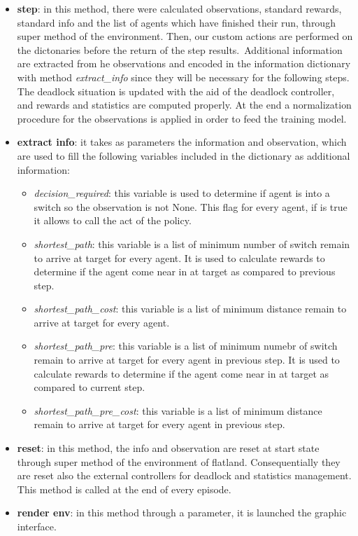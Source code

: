 \begin{itemize}
\item \textbf{step}: in this method, there were calculated observations, standard rewards, standard info and the list of agents which have finished their run, through super method of the environment.
Then, our custom actions are performed on the dictonaries before the return of the step results.\ Additional information are extracted from he observations and encoded in the information dictionary with method \textit{extract\_info} since they will be necessary for the following steps. The deadlock situation is updated with the aid of the deadlock controller, and rewards and statistics are computed properly. At the end a normalization procedure for the observations is applied in order to feed the training model.
\item \textbf{extract info}: it takes as parameters the information and observation, which are used to fill the following variables included in the dictionary as additional information:
\begin{itemize}
\item \textit{decision\_required}: this variable is used to determine if agent is into a switch so the observation is not None. This flag for every agent, if is true it allows to call the act of the policy.
\item \textit{shortest\_path}: this variable is a list of minimum number of switch remain to arrive at target for every agent. It is used to calculate rewards to determine if the agent come near in at target as compared to previous step.
\item \textit{shortest\_path\_cost}: this variable is a list of minimum distance remain to arrive at target for every agent.
\item \textit{shortest\_path\_pre}: this variable is a list of minimum numebr of switch remain to arrive at target for every agent in previous step. It is used to calculate rewards to determine if the agent come near in at target as compared to current step.
\item \textit{shortest\_path\_pre\_cost}: this variable is a list of minimum distance remain to arrive at target for every agent in previous step.
\end{itemize}
\item \textbf{reset}: in this method, the info and observation are reset at start state through super method of the environment of flatland. Consequentially they are reset also the external controllers for deadlock and statistics management. This method is called at the end of every episode.
\item \textbf{render env}: in this method through a parameter, it is launched the graphic interface.
\end{itemize}
